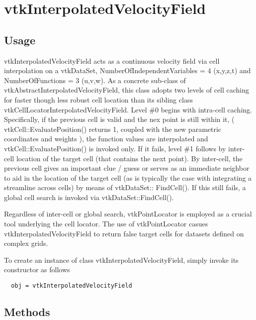 \section{vtkInterpolatedVelocityField}

\subsection{Usage}

  vtkInterpolatedVelocityField acts as a continuous velocity field via
  cell interpolation on a vtkDataSet, NumberOfIndependentVariables = 4
  (x,y,z,t) and NumberOfFunctions = 3 (u,v,w). As a concrete sub-class 
  of vtkAbstractInterpolatedVelocityField, this class adopts two levels 
  of cell caching for faster though less robust cell location than its 
  sibling class vtkCellLocatorInterpolatedVelocityField. Level \#0 begins 
  with intra-cell caching. Specifically, if the previous cell is valid 
  and the nex point is still within it, ( vtkCell::EvaluatePosition() 
  returns 1, coupled with the new parametric coordinates and weights ), 
  the function values are interpolated and vtkCell::EvaluatePosition() 
  is invoked only. If it fails, level \#1 follows by inter-cell location 
  of the target cell (that contains the next point). By inter-cell, the 
  previous cell gives an important clue / guess or serves as an immediate
  neighbor to aid in the location of the target cell (as is typically the 
  case with integrating a streamline across cells) by means of vtkDataSet::
  FindCell(). If this still fails, a global cell search is invoked via 
  vtkDataSet::FindCell(). 
  
  Regardless of inter-cell or global search, vtkPointLocator is employed 
  as a crucial tool underlying the cell locator. The use of vtkPointLocator
  casues vtkInterpolatedVelocityField to return false target cells for 
  datasets defined on complex grids.


To create an instance of class vtkInterpolatedVelocityField, simply
invoke its constructor as follows
\begin{verbatim}
  obj = vtkInterpolatedVelocityField
\end{verbatim}
\subsection{Methods}


